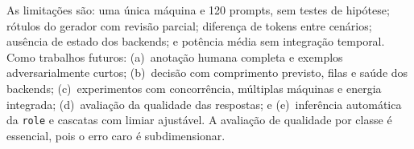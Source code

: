 \documentclass[12pt]{article}
\begin{document}
As limitações são: uma única máquina e 120 prompts, sem testes de hipótese; rótulos do gerador com revisão parcial; diferença de tokens entre cenários; ausência de estado dos backends; e potência média sem integração temporal. Como trabalhos futuros: (a)~anotação humana completa e exemplos adversarialmente curtos; (b)~decisão com comprimento previsto, filas e saúde dos backends; (c)~experimentos com concorrência, múltiplas máquinas e energia integrada; (d)~avaliação da qualidade das respostas; e (e)~inferência automática da \texttt{role} e cascatas com limiar ajustável. A avaliação de qualidade por classe é essencial, pois o erro caro é subdimensionar.

\pagebreak



\end{document}
